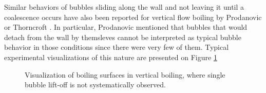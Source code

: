 Similar behaviors of bubbles sliding along the wall and not leaving it until a coalescence occurs have also been reported for vertical flow boiling by Prodanovic \etal \cite{prodanovic_bubble_2002} or Thorncroft \etal \cite{thorncroft_experimental_1998}. In particular, Prodanovic \etal mentioned that bubbles that would detach from the wall by themsleves cannot be interpreted as typical bubble behavior in those conditions since there were very few of them. Typical experimental visualizations of this nature are presented on Figure \ref{fig:exp_nolift}

\begin{figure}[h!]
\begin{center}
\hspace{5pt}
\end{center}
\caption{Visualization of boiling surfaces in vertical boiling, where single bubble lift-off is not systematically observed.} 
\label{fig:exp_nolift}
\end{figure}


